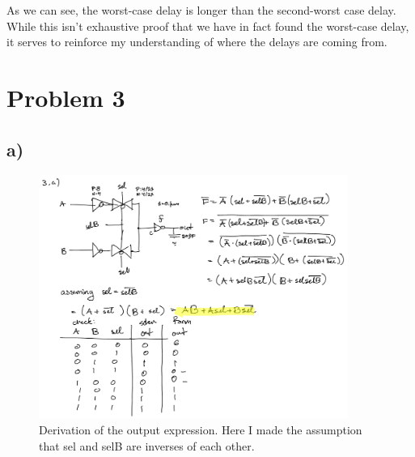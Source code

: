 \documentclass[11pt]{article}
\begin{document}
As we can see, the worst-case delay is longer than the second-worst case delay. While this isn't exhaustive proof that we have in fact found the worst-case delay, it serves to reinforce my understanding of where the delays are coming from.

\section{Problem 3}
\subsection{a)}

\begin{figure}[H]
\centering
  \includegraphics[width=0.9\textwidth]{q3.png}
  \caption{Derivation of the output expression. Here I made the assumption that sel and selB are inverses of each other.}
\end{figure}
\end{document}
